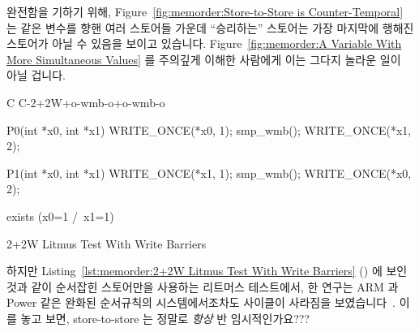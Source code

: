 완전함을 기하기 위해,
Figure~\ref{fig:memorder:Store-to-Store is Counter-Temporal}
는 같은 변수를 향핸 여러 스토어들 가운데 ``승리하는'' 스토어는 가장 마지막에
행해진 스토어가 아닐 수 있음을 보이고 있습니다.
Figure~\ref{fig:memorder:A Variable With More Simultaneous Values} 를 주의깊게
이해한 사람에게 이는 그다지 놀라운 일이 아닐 겁니다.

\begin{listing}[tbp]
{ \scriptsize
\begin{verbbox}[\LstLineNo]
C C-2+2W+o-wmb-o+o-wmb-o
{
}

P0(int *x0, int *x1)
{
  WRITE_ONCE(*x0, 1);
  smp_wmb();
  WRITE_ONCE(*x1, 2);
}


P1(int *x0, int *x1)
{
  WRITE_ONCE(*x1, 1);
  smp_wmb();
  WRITE_ONCE(*x0, 2);
}

exists (x0=1 /\ x1=1)
\end{verbbox}
}
\centering
\theverbbox
\caption{2+2W Litmus Test With Write Barriers}
\label{lst:memorder:2+2W Litmus Test With Write Barriers}
\end{listing}

\QuickQuiz{}
	하지만
	Listing~\ref{lst:memorder:2+2W Litmus Test With Write Barriers}
	() 에 보인 것과 같이 순서잡힌
	스토어만을 사용하는 리트머스 테스트에서, 한 연구는 ARM 과 Power 같은
	완화된 순서규칙의 시스템에서조차도 사이클이 사라짐을
	보였습니다~\cite{test6-pdf}.
	이를 놓고 보면, store-to-store 는 정말로 \emph{항상} 반 임시적인가요???
	\iffalse

